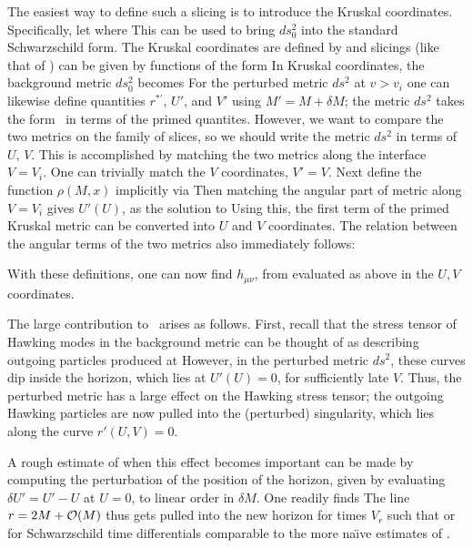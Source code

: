 The easiest way to define such a slicing is to introduce the Kruskal coordinates.  Specifically, let 
%
\eqn{}
%
where 
%
\eqn{}
%
This can be used to bring $ds_0^2$ into the standard Schwarzschild form.  The Kruskal coordinates are defined by
%
\eqn{}
%
and slicings (like that of ) can be given by functions of the form 
%
\eqn{}
%
In Kruskal coordinates, the background metric $ds_0^2$ becomes
%
\eqn{}
%
For the perturbed metric $ds^2$ at $v>v_i$ one can likewise define quantities $r^{*\prime}$, $U'$, and $V'$ using $M'=M+\delta M$; the metric $ds^2$ takes the form \kruskmet\ in terms of the primed quantites.  However, we want to compare the two metrics on the family of slices, so we should write the metric $ds^2$ in terms of $U$, $V$.  This is accomplished by matching the two metrics along the interface $V=V_i$.  One can trivially match the $V$ coordinates, $V'=V$.  Next define the function $\rho(M,x)$ implicitly via
%
\eqn{}
%
Then matching the angular part of  metric along $V=V_i$ gives $U'(U)$, as the solution to
%
\eqn{}
%
Using this, the first term of the primed Kruskal metric can be converted into $U$ and $V$ coordinates.
The relation between the angular terms of the two metrics also immediately follows:
%
\eqn{}
%


With these definitions, one can now find $h_{\mu\nu}$, from
%
\eqn{}
%
evaluated as above in the $U,V$ coordinates.  

The large contribution to \treeM\ arises as follows.  First, recall that the stress tensor of Hawking modes in the background metric can be thought of as describing outgoing particles produced at 
%
\eqn{}
%
However, in the perturbed metric $ds^2$, these curves dip inside the horizon, which lies at $U'(U)=0$, for sufficiently late $V$.  Thus, the perturbed metric has a large effect on the Hawking stress tensor; the outgoing Hawking particles are now pulled into the (perturbed) singularity, which lies along the curve $r'(U,V)=0$.  

A rough estimate of when this effect becomes important can be made by computing the perturbation of the position of the horizon, given by evaluating $\delta U' = U'-U$ at $U=0$, to linear order in $\delta M$.  One readily finds 
%
\eqn{}
%
The line $r=2M +{\cal O}(M)$ thus gets pulled into the new horizon for times $V_r$ such that 
%
\eqn{}
%
or for Schwarzschild time differentials 
%
\eqn{}
%
comparable to the more na\"\i ve estimates of \SGnonloc.

